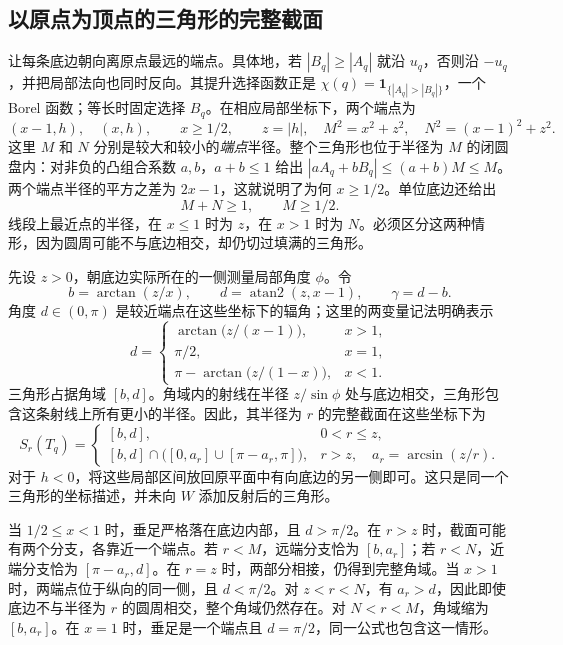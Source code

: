 \subsection{以原点为顶点的三角形的完整截面}
\label{subsec:core-sections}

让每条底边朝向离原点最远的端点。具体地，若 $|B_q|\geq|A_q|$ 就沿 $u_q$，否则沿 $-u_q$，并把局部法向也同时反向。其提升选择函数正是 $\chi(q)=\mathbf1_{\{|A_q|>|B_q|\}}$，一个 Borel 函数；等长时固定选择 $B_q$。在相应局部坐标下，两个端点为
\begin{equation}
 (x-1,h),\quad(x,h),\qquad x\geq1/2,
 \qquad z=|h|,\quad
 M^2=x^2+z^2,\quad N^2=(x-1)^2+z^2.
\label{eq:core-endpoints}
\end{equation}
这里 $M$ 和 $N$ 分别是较大和较小的\emph{端点}半径。整个三角形也位于半径为 $M$ 的闭圆盘内：对非负的凸组合系数 $a,b$，$a+b\leq1$ 给出 $|aA_q+bB_q|\leq(a+b)M\leq M$。两个端点半径的平方之差为 $2x-1$，这就说明了为何 $x\geq1/2$。单位底边还给出
\begin{equation}
                         M+N\geq1,\qquad M\geq1/2.
\label{eq:core-unit}
\end{equation}
线段上最近点的半径，在 $x\leq1$ 时为 $z$，在 $x>1$ 时为 $N$。必须区分这两种情形，因为圆周可能不与底边相交，却仍切过填满的三角形。

先设 $z>0$，朝底边实际所在的一侧测量局部角度 $\phi$。令
\[
 b=\arctan(z/x),\qquad d=\operatorname{atan2}(z,x-1),\qquad
 \gamma=d-b.
\]
角度 $d\in(0,\pi)$ 是较近端点在这些坐标下的辐角；这里的两变量记法明确表示
\[
 d=\begin{cases}
 \arctan\bigl(z/(x-1)\bigr),&x>1,\\
 \pi/2,&x=1,\\
 \pi-\arctan\bigl(z/(1-x)\bigr),&x<1.
 \end{cases}
\]
三角形占据角域 $[b,d]$。角域内的射线在半径 $z/\sin\phi$ 处与底边相交，三角形包含这条射线上所有更小的半径。因此，其半径为 $r$ 的完整截面在这些坐标下为
\begin{equation}
 S_r(T_q)=
 \begin{cases}
 [b,d],&0<r\leq z,\\[2pt]
 [b,d]\cap\bigl([0,a_r]\cup[\pi-a_r,\pi]\bigr),
       &r>z,\quad a_r=\arcsin(z/r).
 \end{cases}
\label{eq:core-full-section}
\end{equation}
对于 $h<0$，将这些局部区间放回原平面中有向底边的另一侧即可。这只是同一个三角形的坐标描述，并未向 $W$ 添加反射后的三角形。

当 $1/2\leq x<1$ 时，垂足严格落在底边内部，且 $d>\pi/2$。在 $r>z$ 时，截面可能有两个分支，各靠近一个端点。若 $r<M$，远端分支恰为 $[b,a_r]$；若 $r<N$，近端分支恰为 $[\pi-a_r,d]$。在 $r=z$ 时，两部分相接，仍得到完整角域。当 $x>1$ 时，两端点位于纵向的同一侧，且 $d<\pi/2$。对 $z<r<N$，有 $a_r>d$，因此即使底边不与半径为 $r$ 的圆周相交，整个角域仍然存在。对 $N<r<M$，角域缩为 $[b,a_r]$。在 $x=1$ 时，垂足是一个端点且 $d=\pi/2$，同一公式也包含这一情形。

